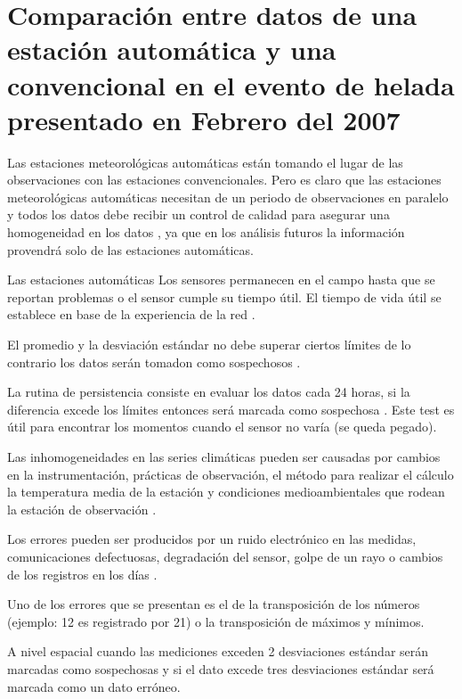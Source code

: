 
\section{Comparación entre datos de una estación automática y una convencional en el evento de helada presentado en Febrero del 2007}


Las estaciones meteorológicas automáticas están tomando el lugar de las observaciones con las estaciones convencionales. Pero es claro que las estaciones meteorológicas automáticas necesitan de un periodo de observaciones en paralelo y todos los datos debe recibir un control de calidad para asegurar una homogeneidad en los datos \citep{Ying2004}, ya que en los análisis futuros la información provendrá solo de las estaciones automáticas.

Las estaciones automáticas Los sensores permanecen en el campo hasta que se reportan problemas o el sensor cumple su tiempo útil. El tiempo de vida útil se establece en base de la experiencia de la red \citep{Shafer2000}.

El promedio y la desviación estándar no debe superar ciertos límites de lo contrario los datos serán tomadon como sospechosos \citep{Shafer2000}.

La rutina de persistencia consiste en evaluar los datos cada 24 horas, si la diferencia excede los límites entonces será marcada como sospechosa \citep{Shafer2000}. Este test es útil para encontrar los momentos cuando el sensor no varía (se queda pegado).

Las inhomogeneidades en las series climáticas pueden ser causadas por cambios en la instrumentación, prácticas de observación, el método para realizar el cálculo la temperatura media de la estación y condiciones medioambientales que rodean la estación de observación \citep{Menne2001}.

Los errores pueden ser producidos por un ruido electrónico en las medidas, comunicaciones defectuosas, degradación del sensor, golpe de un rayo o cambios de los registros en los días \citep{Menne2001}.

Uno de los errores que se presentan es el de la transposición de los números (ejemplo: 12 es registrado por 21) o la transposición de máximos y mínimos.

A nivel espacial cuando las mediciones exceden 2 desviaciones estándar serán marcadas como sospechosas y si el dato excede tres desviaciones estándar será marcada como un dato erróneo.

